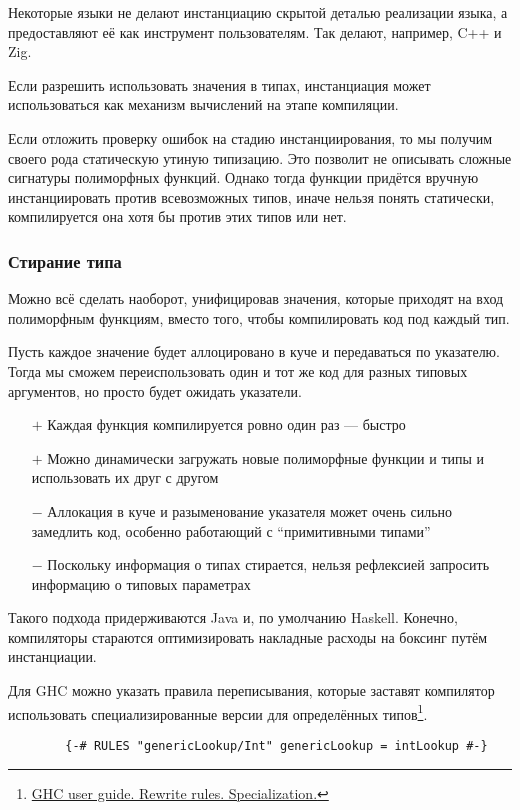 \documentclass[12pt]{article}
\newcommand{\positive}{$+$} %
\newcommand{\negative}{{\color{red} $-$}} %
\begin{document}
    Некоторые языки не делают инстанциацию скрытой деталью реализации языка, а предоставляют её как инструмент пользователям.
    Так делают, например, C++ и Zig.

    Если разрешить использовать значения в типах, инстанциация может использоваться как механизм вычислений на этапе компиляции.

    Если отложить проверку ошибок на стадию инстанциирования, то мы получим своего рода статическую утиную типизацию.
    Это позволит не описывать сложные сигнатуры полиморфных функций.
    Однако тогда функции придётся вручную инстанциировать против всевозможных типов, иначе нельзя понять статически, компилируется она хотя бы против этих типов или нет.

    \subsubsection{Стирание типа} \label{subsubsec:type-erasure}

    Можно всё сделать наоборот, унифицировав значения, которые приходят на вход полиморфным функциям, вместо того, чтобы компилировать код под каждый тип.

    Пусть каждое значение будет аллоцировано в куче и передаваться по указателю.
    Тогда мы сможем переиспользовать один и тот же код для разных типовых аргументов, но просто будет ожидать указатели.

    \begin{itemize}
        \item[\positive] Каждая функция компилируется ровно один раз --- быстро
        \item[\positive] Можно динамически загружать новые полиморфные функции и типы и использовать их друг с другом
        \item[\negative] Аллокация в куче и разыменование указателя может очень сильно замедлить код, особенно работающий с ``примитивными типами''
        \item[\negative] Поскольку информация о типах стирается, нельзя рефлексией запросить информацию о типовых параметрах
    \end{itemize}

    Такого подхода придерживаются Java и, по умолчанию Haskell.
    Конечно, компиляторы стараются оптимизировать накладные расходы на боксинг путём инстанциации.

    Для GHC можно указать правила переписывания, которые заставят компилятор использовать специализированные версии для определённых типов\footnote{\href{https://downloads.haskell.org/~ghc/6.12.2/docs/html/users\_guide/rewrite-rules.html\#rule-spec}{GHC user guide. Rewrite rules. Specialization.}}.
    \begin{verbatim}
        {-# RULES "genericLookup/Int" genericLookup = intLookup #-}
    \end{verbatim}
\end{document}
